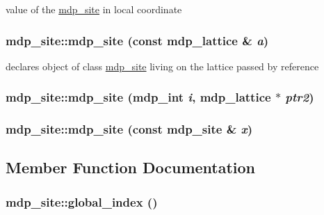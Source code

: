value of the \hyperlink{classmdp__site}{mdp\_\-site} in local coordinate \hypertarget{classmdp__site_ab61e8e96573d58449ee28b9505ca799b}{
\subsubsection[{mdp\_\-site}]{\setlength{\rightskip}{0pt plus 5cm}mdp\_\-site::mdp\_\-site (const {\bf mdp\_\-lattice} \& {\em a})}}
\label{classmdp__site_ab61e8e96573d58449ee28b9505ca799b}
declares object of class \hyperlink{classmdp__site}{mdp\_\-site} living on the lattice passed by reference \hypertarget{classmdp__site_a6bde992431323419da31c2ce584d7821}{
\subsubsection[{mdp\_\-site}]{\setlength{\rightskip}{0pt plus 5cm}mdp\_\-site::mdp\_\-site ({\bf mdp\_\-int} {\em i}, \/  {\bf mdp\_\-lattice} $\ast$ {\em ptr2})}}
\label{classmdp__site_a6bde992431323419da31c2ce584d7821}
\hypertarget{classmdp__site_aa16c96d8e1013d1581df1ae3a980d272}{
\subsubsection[{mdp\_\-site}]{\setlength{\rightskip}{0pt plus 5cm}mdp\_\-site::mdp\_\-site (const {\bf mdp\_\-site} \& {\em x})}}
\label{classmdp__site_aa16c96d8e1013d1581df1ae3a980d272}


\subsection{Member Function Documentation}
\hypertarget{classmdp__site_aff34724d521041f255daf4fad09a0408}{
\subsubsection[{global\_\-index}]{ mdp\_\-site::global\_\-index ()}}
\label{classmdp__site_aff34724d521041f255daf4fad09a0408}


